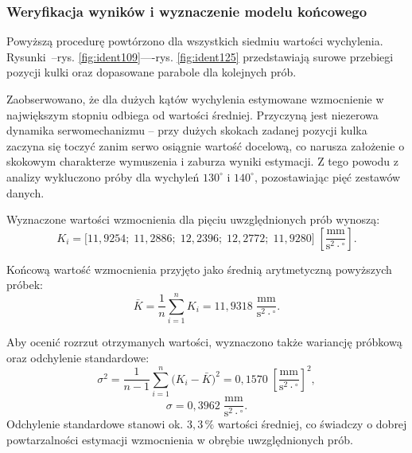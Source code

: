 \subsubsection{Weryfikacja wyników i wyznaczenie modelu końcowego}
 
Powyższą procedurę powtórzono dla wszystkich siedmiu wartości wychylenia.
Rysunki~--rys. \ref{fig:ident109}----rys. \ref{fig:ident125} przedstawiają surowe przebiegi pozycji
kulki oraz dopasowane parabole dla kolejnych prób.
 
Zaobserwowano, że dla dużych kątów wychylenia estymowane wzmocnienie w największym
stopniu odbiega od wartości średniej.
Przyczyną jest niezerowa dynamika serwomechanizmu -- przy dużych skokach zadanej
pozycji kulka zaczyna się toczyć zanim serwo osiągnie wartość docelową, co narusza
założenie o skokowym charakterze wymuszenia i zaburza wyniki estymacji.
Z tego powodu z analizy wykluczono próby dla wychyleń $130^\circ$ i $140^\circ$,
pozostawiając pięć zestawów danych.
 
Wyznaczone wartości wzmocnienia dla pięciu uwzględnionych prób wynoszą:
\begin{equation}
    K_i = \bigl[11{,}9254;\;11{,}2886;\;12{,}2396;\;12{,}2772;\;11{,}9280\bigr]
    \;\left[\frac{\mathrm{mm}}{\mathrm{s}^2 \cdot {^\circ}}\right].
    \label{eq:Klist}
\end{equation}
 
Końcową wartość wzmocnienia przyjęto jako średnią arytmetyczną powyższych próbek:
\begin{equation}
    \bar{K} = \frac{1}{n}\sum_{i=1}^{n} K_i = 11{,}9318\;\frac{\mathrm{mm}}{\mathrm{s}^2 \cdot {^\circ}}.
    \label{eq:Kfinal}
\end{equation}

Aby ocenić rozrzut otrzymanych wartości, wyznaczono także wariancję próbkową oraz
odchylenie standardowe:
\begin{equation}
    \sigma^2 = \frac{1}{n-1}\sum_{i=1}^{n}\bigl(K_i - \bar{K}\bigr)^2
        = 0{,}1570\;\left[\frac{\mathrm{mm}}{\mathrm{s}^2 \cdot {^\circ}}\right]^2,
    \label{eq:Kvar}
\end{equation}
\begin{equation}
    \sigma  = 0{,}3962\;\frac{\mathrm{mm}}{\mathrm{s}^2 \cdot {^\circ}}.
    \label{eq:Kstd}
\end{equation}
Odchylenie standardowe stanowi ok. $3{,}3\,\%$ wartości średniej, co świadczy o
dobrej powtarzalności estymacji wzmocnienia w obrębie uwzględnionych prób.

